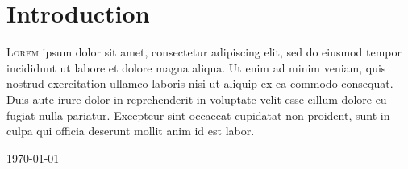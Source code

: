 \documentclass[../main.tex]{subfiles}
\begin{document}
	\newpage
	\section*{Introduction}
	\lettrine[lines=3, findent=3pt, nindent=0pt]{L}{orem}
	ipsum dolor sit amet, consectetur adipiscing elit, sed do eiusmod
	tempor incididunt ut labore et dolore magna aliqua. Ut enim ad minim
	veniam, quis nostrud exercitation ullamco laboris nisi ut aliquip ex ea
	commodo consequat. Duis aute irure dolor in reprehenderit in voluptate
	velit esse cillum dolore eu fugiat nulla pariatur. Excepteur sint occaecat
	cupidatat non proident, sunt in culpa qui officia deserunt mollit anim id
	est labor.

	\lipsum[2-3]	

	\begin{flushright}
	 	\today{}
	\end{flushright}
	\color{orange}{\rule{\textwidth}{0.08cm}}
\end{document}
